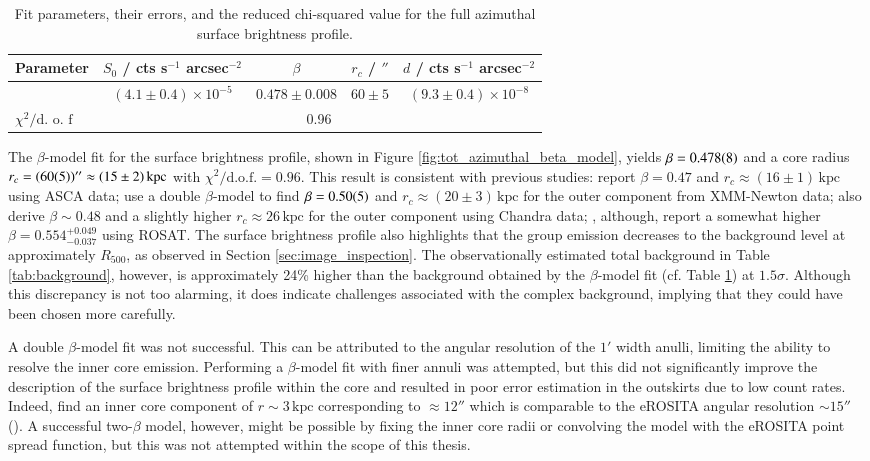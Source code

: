 \begin{table}[htbp]
    \centering
    \begin{tabular}{lcccc}
    \toprule
    Parameter & $S_0$ / cts s$^{-1}$ arcsec$^{-2}$ & $\beta$ & $r_c$ / \(''\) & $d$ / cts s$^{-1}$ arcsec$^{-2}$ \\
    \midrule
        & $(4.1 \pm 0.4) \times 10^{-5}$ & $0.478 \pm 0.008$ & $60 \pm 5$ & $(9.3 \pm 0.4) \times 10^{-8}$ \\
    \midrule
    \(\chi^2 / \text{d. o. f}\) & \multicolumn{4}{c}{0.96} \\
    \bottomrule
    \end{tabular}
    \caption[Fit parameters for the full azimuthal surface brightness profile.]{Fit parameters, their errors, and the reduced chi-squared value for the full azimuthal surface brightness profile.}
    \label{tab:full_az_fit_parameters}
\end{table}

The \(\beta\)-model fit for the surface brightness profile, shown in Figure \ref{fig:tot_azimuthal_beta_model}, yields \(\beta = \num{0.478\pm0.008}\) and a core radius \(r_c = (\num{60\pm5})'' \approx (15\pm2)\,\text{kpc}\) with \(\chi^2/\text{d.o.f.} = 0.96\). This result is consistent with previous studies: \citep{Kawaharada_2003} report \(\beta = 0.47\) and \(r_c \approx (16\pm1)\,\text{kpc}\) using ASCA data; \citep{Kawaharada_2009} use a double \(\beta\)-model to find \(\beta = \num{0.50\pm0.05}\) and \(r_c \approx (20\pm3)\,\text{kpc}\) for the outer component from XMM-Newton data; \citep{Sun_2003} also derive \(\beta \sim 0.48\) and a slightly higher \(r_c \approx 26\,\text{kpc}\) for the outer component using Chandra data; \citep{Reiprich_2002}, although, report a somewhat higher \(\beta = 0.554^{+0.049}_{-0.037}\) using ROSAT. The surface brightness profile also highlights that the group emission decreases to the background level at approximately \(R_{500}\), as observed in Section \ref{sec:image_inspection}. The observationally estimated total background in Table \ref{tab:background}, however, is approximately 24\% higher than the background obtained by the \(\beta\)-model fit (cf. Table \ref{tab:full_az_fit_parameters}) at \(1.5\sigma\). Although this discrepancy is not too alarming, it does indicate challenges associated with the complex background, implying that they could have been chosen more carefully.

A double \(\beta\)-model fit was not successful. This can be attributed to the angular resolution of the \(1'\) width anulli, limiting the ability to resolve the inner core emission. Performing a \(\beta\)-model fit with finer annuli was attempted, but this did not significantly improve the description of the surface brightness profile within the core and resulted in poor error estimation in the outskirts due to low count rates. Indeed, \citep{Kawaharada_2009} find an inner core component of \(r \sim 3\,\text{kpc}\) corresponding to \(\approx 12'' \) which is comparable to the eROSITA angular resolution \(\sim 15''\) (\cite{Predehl2021}). A successful two-\(\beta\) model, however, might be possible by fixing the inner core radii or convolving the model with the eROSITA point spread function, but this was not attempted within the scope of this thesis.
